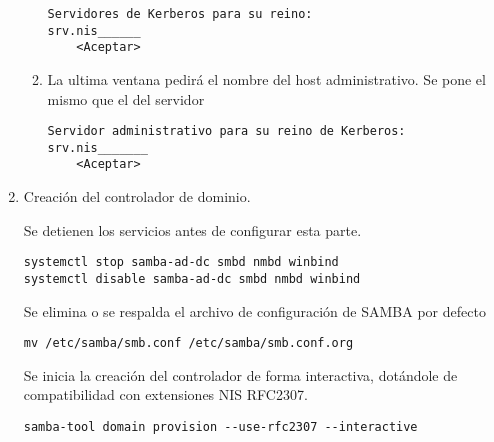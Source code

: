 \documentclass[../main.tex]{subfiles}
\begin{document}
\begin{enumerate}
\begin{enumerate}
     \begin{listing}[H]
  \begin{verbatim}
Servidores de Kerberos para su reino:
srv.nis______
    <Aceptar>
\end{verbatim}
\end{listing}

    \item La ultima ventana pedirá el nombre del host administrativo.
      Se pone el mismo que el del servidor

      \begin{listing}[H]
  \begin{verbatim}
Servidor administrativo para su reino de Kerberos:
srv.nis_______
    <Aceptar>
\end{verbatim}
\end{listing}


  
    \end{enumerate}

  \item Creación del controlador de dominio.

    Se detienen los servicios antes de configurar esta parte.

    \begin{listing}[H]
  \begin{verbatim}
systemctl stop samba-ad-dc smbd nmbd winbind
systemctl disable samba-ad-dc smbd nmbd winbind
\end{verbatim}
\end{listing}

    Se elimina o se respalda el archivo de configuración de
    SAMBA por defecto
    \begin{listing}[H]
  \begin{verbatim}
mv /etc/samba/smb.conf /etc/samba/smb.conf.org
\end{verbatim}
\end{listing}

    Se inicia la creación del controlador de forma interactiva, dotándole de compatibilidad con extensiones NIS RFC2307.

    \begin{listing}[H]
  \begin{verbatim}
samba-tool domain provision --use-rfc2307 --interactive
\end{verbatim}
\end{listing}


\end{enumerate}
\end{document}
